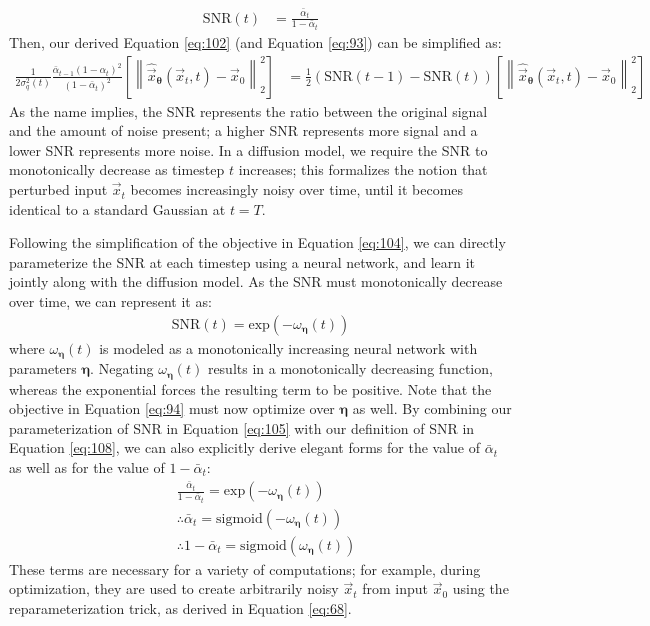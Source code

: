 \begin{align}
    \text{SNR}(t) &= \frac{\bar\alpha_t}{1 -\bar\alpha_{t}} \label{eq:108}
\end{align}
Then, our derived Equation \ref{eq:102} (and Equation \ref{eq:93}) can be simplified as:
\begin{align}
\frac{1}{2\sigma_q^2(t)}\frac{\bar\alpha_{t-1}(1-\alpha_t)^2}{(1 -\bar\alpha_{t})^2}\left[\left\lVert\hat \vec{x}_{\bm{\theta}}(\vec{x}_t, t) - \vec{x}_0\right\rVert_2^2\right] &= \frac{1}{2}\left(\text{SNR}(t-1) -\text{SNR}(t)\right)\left[\left\lVert\hat \vec{x}_{\bm{\theta}}(\vec{x}_t, t) - \vec{x}_0\right\rVert_2^2\right] \label{eq:104}
\end{align}
As the name implies, the SNR represents the ratio between the original signal and the amount of noise present; a higher SNR represents more signal and a lower SNR represents more noise.  In a diffusion model, we require the SNR to monotonically decrease as timestep $t$ increases; this formalizes the notion that perturbed input $\vec{x}_t$ becomes increasingly noisy over time, until it becomes identical to a standard Gaussian at $t=T$.

Following the simplification of the objective in Equation \ref{eq:104}, we can directly parameterize the SNR at each timestep using a neural network, and learn it jointly along with the diffusion model.  As the SNR must monotonically decrease over time, we can represent it as:
\begin{align}
    \text{SNR}(t) = \text{exp}(-\omega_{\bm{\eta}}(t)) \label{eq:105}
\end{align}
where $\omega_{\bm{\eta}}(t)$ is modeled as a monotonically increasing neural network with parameters $\bm{\eta}$.  Negating $\omega_{\bm{\eta}}(t)$ results in a monotonically decreasing function, whereas the exponential forces the resulting term to be positive.
Note that the objective in Equation \ref{eq:94} must now optimize over $\bm{\eta}$ as well.  By combining our parameterization of SNR in Equation \ref{eq:105} with our definition of SNR in Equation \ref{eq:108}, we can also explicitly derive elegant forms for the value of $\bar\alpha_t$ as well as for the value of $1 - \bar\alpha_t$:
\begin{align}
    &\frac{\bar\alpha_t}{1 -\bar\alpha_{t}} = \text{exp}(-\omega_{\bm{\eta}}(t))\\
    &\therefore \bar\alpha_t = \text{sigmoid}(-\omega_{\bm{\eta}}(t))\\
    &\therefore 1 - \bar\alpha_t = \text{sigmoid}(\omega_{\bm{\eta}}(t))
\end{align}
These terms are necessary for a variety of computations; for example, during optimization, they are used to create arbitrarily noisy $\vec{x}_t$ from input $\vec{x}_0$ using the reparameterization trick, as derived in Equation \ref{eq:68}.
